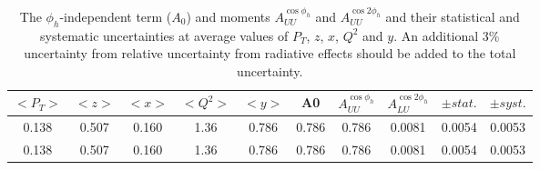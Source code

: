 \documentclass[aps,prl,twocolumn,showpacs,superscriptaddress,groupedaddress]{revtex4}  %
\newcommand{\xbj}{x}
\begin{document}
\begin{table}[ht]
  \begin{center}	
    \begin{tabular}{|c|c|c|c|c||c||c||c|c|c|}
       \hline	
	  {$<P_T>$} & {$<z>$} & {$<\xbj >$} & {$<Q^2 >$} & {$<y>$} & A0 & {$A^{\cos\phi_h}_{UU}$} & {$A^{\cos 2\phi_h}_{LU}$} & {$\pm stat.$}  & {$\pm syst.$}\\
	  \hline 
	    \hline 
{0.138 } &  {0.507} & {0.160} & {1.36} & {0.786} & {0.786} & {0.786} & {0.0081} &  {0.0054} & {0.0053}\\
{0.138 } &  {0.507} & {0.160} & {1.36} & {0.786} & {0.786} & {0.786} & {0.0081} &  {0.0054} & {0.0053}\\
	  \hline
    \end{tabular}	
    \caption{The $\phi_h$-independent term ($A_0$) and  moments $A^{\cos \phi_h}_{UU}$ and  $A^{\cos 2\phi_h}_{UU}$ and their statistical and systematic uncertainties at average values of $P_T$, $z$, $\xbj$, $Q^2$ and $y$. An additional 3\% uncertainty from relative uncertainty from radiative effects should be added to the total uncertainty.} 
    \label{aluxbtb}
  \end{center}	
\end{table}
%
%

%

\end{document}
